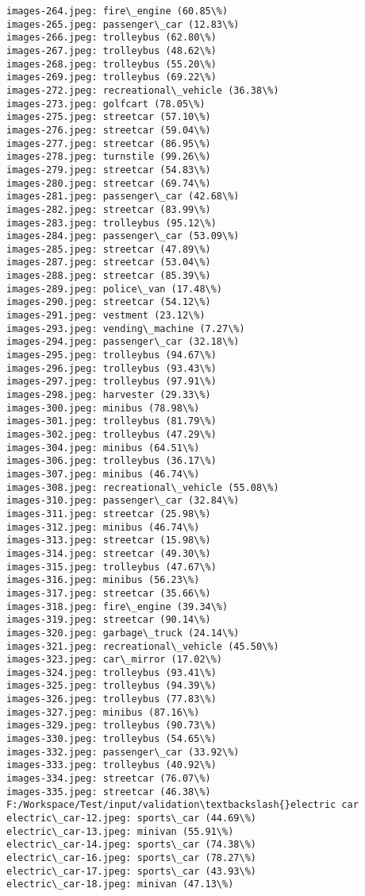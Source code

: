 \documentclass[11pt]{article}
\begin{document}
\begin{Verbatim}[commandchars=\\\{\}]
images-264.jpeg: fire\_engine (60.85\%)
images-265.jpeg: passenger\_car (12.83\%)
images-266.jpeg: trolleybus (62.80\%)
images-267.jpeg: trolleybus (48.62\%)
images-268.jpeg: trolleybus (55.20\%)
images-269.jpeg: trolleybus (69.22\%)
images-272.jpeg: recreational\_vehicle (36.38\%)
images-273.jpeg: golfcart (78.05\%)
images-275.jpeg: streetcar (57.10\%)
images-276.jpeg: streetcar (59.04\%)
images-277.jpeg: streetcar (86.95\%)
images-278.jpeg: turnstile (99.26\%)
images-279.jpeg: streetcar (54.83\%)
images-280.jpeg: streetcar (69.74\%)
images-281.jpeg: passenger\_car (42.68\%)
images-282.jpeg: streetcar (83.99\%)
images-283.jpeg: trolleybus (95.12\%)
images-284.jpeg: passenger\_car (53.09\%)
images-285.jpeg: streetcar (47.89\%)
images-287.jpeg: streetcar (53.04\%)
images-288.jpeg: streetcar (85.39\%)
images-289.jpeg: police\_van (17.48\%)
images-290.jpeg: streetcar (54.12\%)
images-291.jpeg: vestment (23.12\%)
images-293.jpeg: vending\_machine (7.27\%)
images-294.jpeg: passenger\_car (32.18\%)
images-295.jpeg: trolleybus (94.67\%)
images-296.jpeg: trolleybus (93.43\%)
images-297.jpeg: trolleybus (97.91\%)
images-298.jpeg: harvester (29.33\%)
images-300.jpeg: minibus (78.98\%)
images-301.jpeg: trolleybus (81.79\%)
images-302.jpeg: trolleybus (47.29\%)
images-304.jpeg: minibus (64.51\%)
images-306.jpeg: trolleybus (36.17\%)
images-307.jpeg: minibus (46.74\%)
images-308.jpeg: recreational\_vehicle (55.08\%)
images-310.jpeg: passenger\_car (32.84\%)
images-311.jpeg: streetcar (25.98\%)
images-312.jpeg: minibus (46.74\%)
images-313.jpeg: streetcar (15.98\%)
images-314.jpeg: streetcar (49.30\%)
images-315.jpeg: trolleybus (47.67\%)
images-316.jpeg: minibus (56.23\%)
images-317.jpeg: streetcar (35.66\%)
images-318.jpeg: fire\_engine (39.34\%)
images-319.jpeg: streetcar (90.14\%)
images-320.jpeg: garbage\_truck (24.14\%)
images-321.jpeg: recreational\_vehicle (45.50\%)
images-323.jpeg: car\_mirror (17.02\%)
images-324.jpeg: trolleybus (93.41\%)
images-325.jpeg: trolleybus (94.39\%)
images-326.jpeg: trolleybus (77.83\%)
images-327.jpeg: minibus (87.16\%)
images-329.jpeg: trolleybus (90.73\%)
images-330.jpeg: trolleybus (54.65\%)
images-332.jpeg: passenger\_car (33.92\%)
images-333.jpeg: trolleybus (40.92\%)
images-334.jpeg: streetcar (76.07\%)
images-335.jpeg: streetcar (46.38\%)
F:/Workspace/Test/input/validation\textbackslash{}electric car
electric\_car-12.jpeg: sports\_car (44.69\%)
electric\_car-13.jpeg: minivan (55.91\%)
electric\_car-14.jpeg: sports\_car (74.38\%)
electric\_car-16.jpeg: sports\_car (78.27\%)
electric\_car-17.jpeg: sports\_car (43.93\%)
electric\_car-18.jpeg: minivan (47.13\%)

\end{Verbatim}
\end{document}
